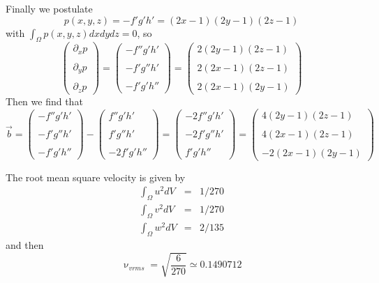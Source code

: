 Finally we postulate 
\[
p(x,y,z) = -f'g'h'=(2x-1)(2y-1)(2z-1)
\]
with $\int_\Omega p(x,y,z) dx dy dz =0$, so
\[ 
\left(
\begin{array}{c}
\partial_x p \\ \\
\partial_y p \\ \\
\partial_z p 
\end{array}
\right) 
=
\left(
\begin{array}{c}
-f''g'h' \\\\
-f'g''h' \\\\
-f'g'h'' 
\end{array}
\right) 
=
\left(
\begin{array}{c}
2(2y-1)(2z-1) \\\\
2(2x-1)(2z-1) \\\\
2(2x-1)(2y-1) 
\end{array}
\right) 
\]
Then we find that 
\[
\vec{b}
=
\left(
\begin{array}{c}
-f''g'h' \\\\
-f'g''h' \\\\
-f'g'h''
\end{array}
\right)
-
\left(
\begin{array}{c}
f''g' h'     \\ \\
f'g'' h'    \\ \\
-2f'g'h''
\end{array}
\right) 
=
\left(
\begin{array}{c}
-2f''g' h'     \\ \\
-2f'g'' h'    \\ \\
f'g'h''
\end{array}
\right) 
=
\left(
\begin{array}{c}
4(2y-1)(2z-1)\\ \\
4(2x-1)(2z-1) \\ \\
-2(2x-1)(2y-1) 
\end{array}
\right)
\]


The root mean square velocity is given by 
\begin{eqnarray}
\int_\Omega u^2 dV &=& 1/270 \\
\int_\Omega v^2 dV &=& 1/270 \\
\int_\Omega w^2 dV &=& 2/135
\end{eqnarray}
and then 
\[
\upnu_{vrms} =\sqrt{\frac{6}{270}} \simeq 0.1490712
\]


